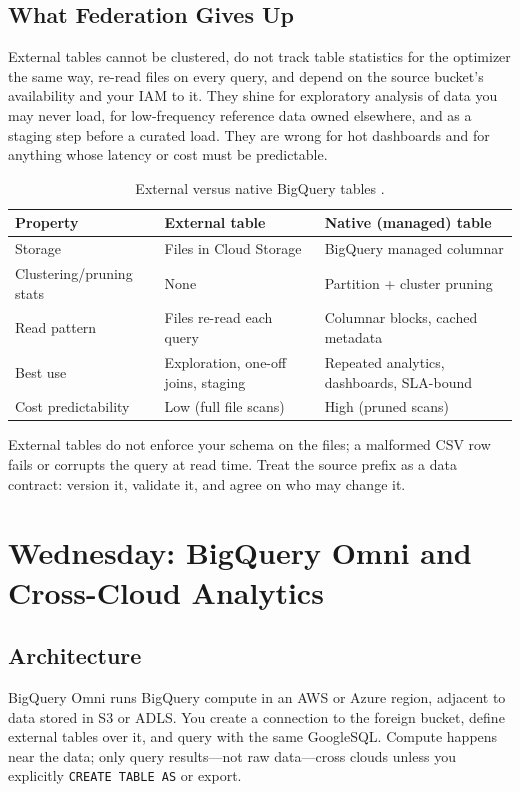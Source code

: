 \subsection{What Federation Gives Up}
External tables cannot be clustered, do not track table statistics for the optimizer the same way, re-read files on every query, and depend on the source bucket's availability and your IAM to it. They shine for exploratory analysis of data you may never load, for low-frequency reference data owned elsewhere, and as a staging step before a curated load. They are wrong for hot dashboards and for anything whose latency or cost must be predictable.

\begin{table}[H]
\centering
\small
\begin{tabular}{@{}p{3.6cm}p{4.6cm}p{4.6cm}@{}} \\
\toprule
\textbf{Property} & \textbf{External table} & \textbf{Native (managed) table} \\
\midrule
Storage & Files in Cloud Storage & BigQuery managed columnar \\
Clustering/pruning stats & None & Partition + cluster pruning \\
Read pattern & Files re-read each query & Columnar blocks, cached metadata \\
Best use & Exploration, one-off joins, staging & Repeated analytics, dashboards, SLA-bound \\
Cost predictability & Low (full file scans) & High (pruned scans) \\
\bottomrule
\end{tabular}
\caption{External versus native BigQuery tables \cite{googlecloudbigqueryexternal}.}
\label{tab:ch7-external-vs-native}
\end{table}

\begin{notebox}
External tables do not enforce your schema on the files; a malformed CSV row fails or corrupts the query at read time. Treat the source prefix as a data contract: version it, validate it, and agree on who may change it.
\end{notebox}

\section{Wednesday: BigQuery Omni and Cross-Cloud Analytics}

\subsection{Architecture}
BigQuery Omni runs BigQuery compute in an AWS or Azure region, adjacent to data stored in S3 or ADLS. You create a connection to the foreign bucket, define external tables over it, and query with the same GoogleSQL. Compute happens near the data; only query results---not raw data---cross clouds unless you explicitly \texttt{CREATE TABLE AS} or export.


